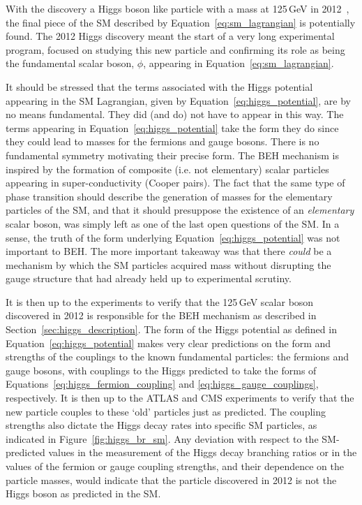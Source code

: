 With the discovery a Higgs boson like particle with a mass at 125\,GeV in 2012~\cite{HDiscoveryATLAS,HDiscoveryCMS},
the final piece of the SM described by Equation~\ref{eq:sm_lagrangian} is potentially found.
The 2012 Higgs discovery meant the start of a very long experimental program, focused
on studying this new particle and confirming its role as being the fundamental scalar boson, $\phi$,
appearing in Equation~\ref{eq:sm_lagrangian}.

It should be stressed that the terms associated with the Higgs potential appearing in the SM
Lagrangian, given by Equation~\ref{eq:higgs_potential}, are by no means fundamental.
They did (and do) not have to appear in this way.
The terms appearing in Equation~\ref{eq:higgs_potential} take the form they do since they
could lead to masses for the fermions and gauge bosons.
There is no fundamental symmetry motivating their precise form.
The BEH mechanism is inspired by the formation of composite (i.e. not elementary) scalar particles
appearing in super-conductivity (Cooper pairs).
The fact that the same type of phase transition should describe the generation of masses for
the elementary particles of the SM, and that it should presuppose the existence of an \textit{elementary}
scalar boson, was simply left as one of the last open questions of the SM.
In a sense, the truth of the form underlying Equation~\ref{eq:higgs_potential} was not important to BEH.
The more important takeaway was that there \textit{could} be a mechanism by which the SM particles acquired
mass without disrupting the gauge structure that had already held up to experimental scrutiny.

It is then up to the experiments to verify that the 125\,GeV scalar boson discovered in 2012
is responsible for the BEH mechanism as described in Section~\ref{sec:higgs_description}.
The form of the Higgs potential as defined in Equation~\ref{eq:higgs_potential} makes
very clear predictions on the form and strengths of the couplings to the known fundamental particles:
the fermions and gauge bosons, with couplings to the Higgs predicted to take the forms
of Equations~\ref{eq:higgs_fermion_coupling} and \ref{eq:higgs_gauge_couplings}, respectively.
It is then up to the ATLAS and CMS experiments to verify that the new particle couples
to these `old' particles just as predicted.
The coupling strengths also dictate the Higgs decay rates into specific SM particles, as indicated
in Figure~\ref{fig:higgs_br_sm}.
Any deviation with respect to the SM-predicted values in the measurement of the Higgs decay branching ratios or
in the values of the fermion or gauge coupling strengths, and their dependence on the
particle masses, would indicate that the particle discovered in 2012 is not the Higgs boson as predicted
in the SM.


